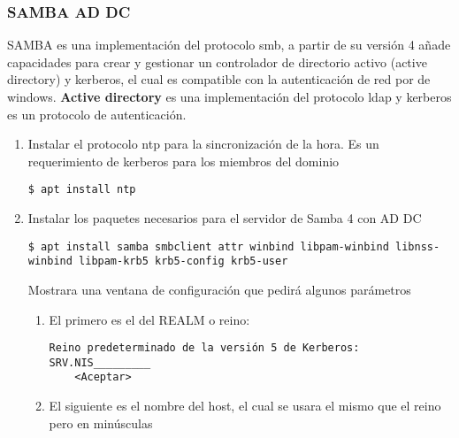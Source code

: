 \documentclass[../main.tex]{subfiles}
\begin{document}
\subsubsection{SAMBA AD DC}\label{sec:samba_addc}

\Gls{SAMBA} es una implementación del protocolo smb, a partir de su
versión 4 añade capacidades para crear y gestionar un controlador
de directorio activo (active directory) y kerberos, el cual es
compatible con la autenticación de red por de windows. \textbf{Active
directory} es una implementación del protocolo \Gls{ldap} y \Gls{kerberos}
es un protocolo de autenticación.

\begin{enumerate}
  \item Instalar el protocolo \Gls{ntp} para la sincronización de la hora.
        Es un requerimiento de \Gls{kerberos} para los miembros del dominio
        \begin{listing}[H]
\begin{verbatim}
$ apt install ntp
\end{verbatim}
\end{listing}

  \item Instalar los paquetes necesarios para el servidor de
        Samba 4 con AD DC
        \begin{listing}[H]
\begin{verbatim}
$ apt install samba smbclient attr winbind libpam-winbind libnss-winbind libpam-krb5 krb5-config krb5-user
\end{verbatim}
\end{listing}

        Mostrara una ventana de configuración que pedirá algunos parámetros

        \begin{enumerate}
          \item El primero es el del REALM o reino:

                \begin{listing}[H]
\begin{verbatim}
Reino predeterminado de la versión 5 de Kerberos:
SRV.NIS_________
    <Aceptar>
\end{verbatim}
\end{listing}


          \item El siguiente es el nombre del host, el cual se usara el mismo
                que el reino pero en minúsculas


\end{enumerate}
\end{enumerate}
\end{document}
